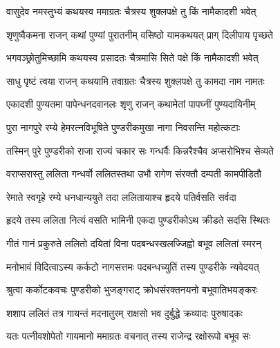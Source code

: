 \label{sec:padma-chaitra-shukla-kamada}

\ganapatyadiDhyanam
\padmaPuranam



\twolineshloka
{वासुदेव नमस्तुभ्यं कथयस्व ममाग्रतः}
{चैत्रस्य शुक्लपक्षे तु किं नामैकादशी भवेत्}%


\twolineshloka
{शृणुष्वैकमना राजन् कथां पुण्यां पुरातनीम्}
{वसिष्ठो यामकथयत् प्राग् दिलीपाय पृच्छते}%


\twolineshloka
{भगवञ्छ्रोतुमिच्छामि कथयस्व प्रसादतः}
{चैत्रमासि सिते पक्षे किं नामैकादशी भवेत्}%


\twolineshloka
{साधु पृष्टं त्वया राजन् कथयामि तवाग्रतः}
{चैत्रस्य शुक्लपक्षे तु कामदा नाम नामतः}%

\twolineshloka
{एकादशी पुण्यतमा पापेन्धनदवानलः}
{शृणु राजन् कथामेतां पापघ्नीं पुण्यदायिनीम्}%

\twolineshloka
{पुरा नागपुरे रम्ये हेमरत्नविभूषिते}
{पुण्डरीकमुखा नागा निवसन्ति महोत्कटाः}%

\twolineshloka
{तस्मिन् पुरे पुण्डरीको राजा राज्यं चकार सः}
{गन्धर्वैः किन्नरैश्चैव अप्सरोभिश्च सेव्यते}%

\twolineshloka
{वराप्सरास्तु ललिता गन्धर्वो ललितस्तथा}
{उभौ रागेण संरक्तौ दम्पती कामपीडितौ}%

\twolineshloka
{रेमाते स्वगृहे रम्ये धनधान्ययुते तदा}
{ललितायाश्च हृदये पतिर्वसति सर्वदा}%

\twolineshloka
{हृदये तस्य ललिता नित्यं वसति भामिनी}
{एकदा पुण्डरीकोऽथ क्रीडते सदसि स्थितः}%

\twolineshloka
{गीतं गानं प्रकुरुते ललितो दयितां विना}
{पदबन्धस्खलज्जिह्वो बभूव ललितां स्मरन्}%

\twolineshloka
{मनोभावं विदित्वाऽस्य कर्कटो नागसत्तमः}
{पदबन्धच्युतिं तस्य पुण्डरीके न्यवेदयत्}%

\twolineshloka
{श्रुत्वा कर्कोटकवचः पुण्डरीको भुजङ्गराट्}
{क्रोधसंरक्तनयनो बभूवातिभयङ्करः}%

\twolineshloka
{शशाप ललितं तत्र गायन्तं मदनातुरम्}
{राक्षसो भव दुर्बुद्धे क्रव्यादः पुरुषादकः}%

\twolineshloka
{यतः पत्नीवशोपेतो गायमानो ममाग्रतः}
{वचनात् तस्य राजेन्द्र रक्षोरूपो बभूव सः}%

